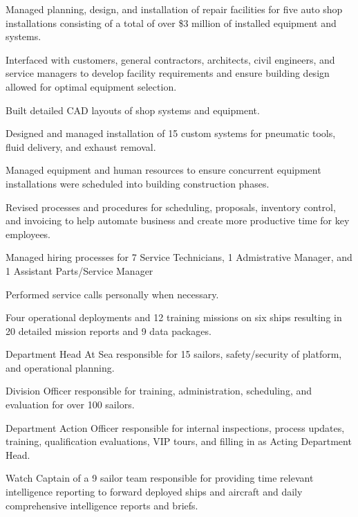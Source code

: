\vspace{\topsep} %
\begin{tightemize}
\item Managed planning, design, and installation of repair facilities for five auto shop installations consisting of a total of over \$3 million of installed equipment and systems.
\item Interfaced with customers, general contractors, architects, civil engineers, and service managers to develop facility requirements and ensure building design allowed for optimal equipment selection.
\item Built detailed CAD layouts of shop systems and equipment.
\item Designed and managed installation of 15 custom systems for pneumatic tools, fluid delivery, and exhaust removal.
\item Managed equipment and human resources to ensure concurrent equipment installations were scheduled into building construction phases.
\item Revised processes and procedures for scheduling, proposals, inventory control, and invoicing to help automate business and create more productive time for key employees.
\item Managed hiring processes for 7 Service Technicians, 1 Admistrative Manager, and 1 Assistant Parts/Service Manager
\item Performed service calls personally when necessary.
\end{tightemize}
\sectionsep

\begin{tightemize}
\item Four operational deployments and 12 training missions on six ships resulting in 20 detailed mission reports and 9 data packages.
\item Department Head At Sea responsible for 15 sailors, safety/security of platform, and operational planning.
\item Division Officer responsible for training, administration, scheduling, and evaluation for over 100 sailors.
\item Department Action Officer responsible for internal inspections, process updates, training, qualification evaluations, VIP tours, and filling in as Acting Department Head.
\item Watch Captain of a 9 sailor team responsible for providing time relevant intelligence reporting to forward deployed ships and aircraft and daily comprehensive intelligence reports and briefs.
\end{tightemize}
\sectionsep
